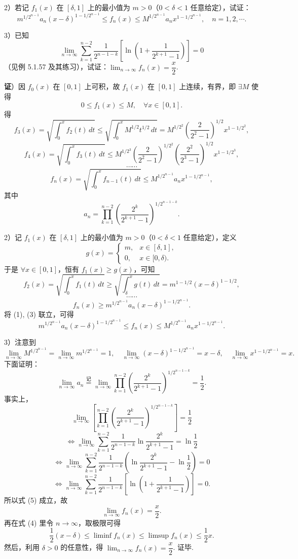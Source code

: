 \documentclass[UTF8, 12pt, fontset=fandol, oneside]{ctexart}
\begin{document}
2）若记 $f_1(x)$ 在 $[\delta,1]$ 上的最小值为 $m>0$（$0<\delta<1$ 任意给定），试证：
\[
m^{1/2^{n-1}}a_n(x-\delta)^{1-1/2^{n-1}}
\le f_n(x)\le
M^{1/2^{n-1}}a_nx^{1-1/2^{n-1}},\quad n=1,2,\cdots.
\]

3）已知
\[
\lim_{n\to\infty}\sum_{k=1}^{n-2}
\frac1{2^{n-1-k}}\left[\ln\left(1+\frac1{2^{k+1}-1}\right)\right]=0
\]
（见例 5.1.57 及其练习），试证：$\displaystyle\lim_{n\to\infty}f_n(x)=\dfrac x2$.

\noindent\textbf{证}）因 $f_0(x)$ 在 $[0,1]$ 上可积，故 $f_1(x)$ 在 $[0,1]$ 上连续，有界，即 $\exists M$ 使得
\[
0\le f_1(x)\le M,\quad \forall x\in[0,1].
\]
得
\[
f_3(x)=\sqrt{\int_0^x f_2(t)\,dt}
\le\sqrt{\int_0^x M^{1/2}t^{1/2}\,dt}
=M^{1/2^2}\left(\frac{2}{2^2-1}\right)^{1/2}x^{1-1/2^2},
\]
\[
f_4(x)=\sqrt{\int_0^x f_3(t)\,dt}
\le M^{1/2^3}
\left(\frac{2}{2^2-1}\right)^{1/2^2}
\left(\frac{2^2}{2^3-1}\right)^{1/2}
x^{1-1/2^3},
\]
\[
\cdots\cdots
\]
\[
f_n(x)=\sqrt{\int_0^x f_{n-1}(t)\,dt}
\le M^{1/2^{n-1}}a_nx^{1-1/2^{n-1}},
\tag{1}
\]
其中
\[
a_n=\prod_{k=1}^{n-2}
\left(\frac{2^k}{2^{k+1}-1}\right)^{1/2^{n-1-k}}.
\tag{2}
\]

2）记 $f_1(x)$ 在 $[\delta,1]$ 上的最小值为 $m>0$（$0<\delta<1$ 任意给定），定义
\[
g(x)=
\begin{cases}
m, & x\in[\delta,1],\\
0, & x\in[0,\delta).
\end{cases}
\]
于是 $\forall x\in[0,1]$，恒有 $f_1(x)\ge g(x)$，可知
\[
f_2(x)=\sqrt{\int_0^x f_1(t)\,dt}
\ge\sqrt{\int_\delta^xg(t)\,dt}
=m^{1-1/2}(x-\delta)^{1-1/2},
\]
\[
\cdots\cdots
\]
\[
f_n(x)\ge m^{1/2^{n-1}}a_n(x-\delta)^{1-1/2^{n-1}}.
\tag{3}
\]
将 (1), (3) 联立，可得
\[
m^{1/2^{n-1}}a_n(x-\delta)^{1-1/2^{n-1}}
\le f_n(x)\le
M^{1/2^{n-1}}a_nx^{1-1/2^{n-1}}.
\tag{4}
\]

3）注意到
\[
\lim_{n\to\infty}M^{1/2^{n-1}}
=\lim_{n\to\infty}m^{1/2^{n-1}}=1,
\quad
\lim_{n\to\infty}(x-\delta)^{1-1/2^{n-1}}=x-\delta,\quad
\lim_{n\to\infty}x^{1-1/2^{n-1}}=x.
\]
下面证明：
\[
\lim_{n\to\infty}a_n
\stackrel{\text{记}}{=}
\lim_{n\to\infty}\prod_{k=1}^{n-2}
\left(\frac{2^k}{2^{k+1}-1}\right)^{1/2^{n-1-k}}
=\frac12.
\tag{5}
\]
事实上，
\[
\lim_{n\to\infty}\left[
\prod_{k=1}^{n-2}
\left(\frac{2^k}{2^{k+1}-1}\right)^{1/2^{n-1-k}}
\right]=\frac12
\]
\[
\Longleftrightarrow
\lim_{n\to\infty}\sum_{k=1}^{n-2}
\frac1{2^{n-1-k}}\ln\frac{2^k}{2^{k+1}-1}
=\ln\frac12
\]
\[
\Longleftrightarrow
\lim_{n\to\infty}\sum_{k=1}^{n-2}
\frac1{2^{n-1-k}}\left(\ln\frac{2^k}{2^{k+1}-1}-\ln\frac12\right)=0
\]
\[
\Longleftrightarrow
\lim_{n\to\infty}\sum_{k=1}^{n-2}
\frac1{2^{n-1-k}}\left[
\ln\left(1+\frac1{2^{k+1}-1}\right)\right]=0.
\]
所以式 (5) 成立，故
\[
\lim_{n\to\infty}f_n(x)=\frac x2.
\]
再在式 (4) 里令 $n\to\infty$，取极限可得
\[
\frac12(x-\delta)\le\liminf f_n(x)\le\limsup f_n(x)\le\frac12x.
\]
然后，利用 $\delta>0$ 的任意性，得 $\displaystyle\lim_{n\to\infty}f_n(x)=\dfrac x2$. 证毕.
\end{document}
